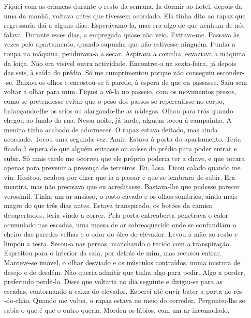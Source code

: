 Fiquei com as crianças durante o resto da semana. Ia dormir ao hotel,
depois da uma da manhã, voltava antes que tivessem acordado. Ela tinha
dito ao rapaz que regressaria daí a alguns dias. Esperávamo­‑la, mas era
algo de que nenhum de nós falava. Durante esses dias, a empregada quase
não veio. Evitava­‑me. Passava às vezes pelo apartamento, quando supunha
que não estivesse ninguém. Punha a roupa na máquina, pendurava­‑a a
secar. Aspirava a cozinha, esvaziava a máquina da loiça. Não era visível
outra actividade. Encontrei­‑a na sexta­‑feira, já depois das seis, à
saída do prédio. Só me cumprimentou porque não conseguiu esconder­‑se.
Baixou os olhos e encostou­‑se à parede, à espera de que eu passasse.
Saiu sem voltar a olhar para mim. Fiquei a vê­‑la no passeio, com os
movimentos presos, como se pretendesse evitar que o peso dos passos se
repercutisse no corpo, balançando­‑lhe os seios ou alargando­‑lhe as
nádegas. Olhou para trás quando chegou ao fundo da rua. Nessa noite, já
tarde, alguém tocou à campainha. A menina tinha acabado de adormecer. O
rapaz estava deitado, mas ainda acordado. Tocou uma segunda vez. Amir.
Estava à porta do apartamento. Teria ficado à espera de que alguém
entrasse ou saísse do prédio para poder entrar e subir. Só mais tarde me
ocorreu que ele próprio poderia ter a chave, e que tocara apenas para
prevenir a presença de terceiros. Eu, Lisa. Ficou calado quando me viu.
Hesitou, acabou por dizer que ia a passar e que se lembrara de subir.
Era mentira, mas não precisava que eu acreditasse. Bastava­‑lhe que
pudesse parecer verosímil. Tinha um ar ansioso, o rosto cavado e os
olhos sombrios, ainda mais magro do que três dias antes. Estava
transpirado, os botões da camisa desapertados, teria vindo a correr.
Pela porta entreaberta penetrava o calor acumulado nas escadas, uma
massa de ar sobreaquecido onde se confundiam o cheiro das paredes velhas
e o odor do óleo do elevador. Levou a mão ao rosto e limpou a testa.
Secou­‑a nas pernas, manchando o tecido com a transpiração. Espreitou
para o interior da sala, por detrás de mim, mas recusou entrar.
Manteve­‑se imóvel, o olhar desviado e os músculos contraídos, numa
mistura de desejo e de desdém. Não queria admitir que tinha algo para
pedir. Algo a perder, preferindo perdê­‑lo. Disse que voltaria no dia
seguinte e dirigiu­‑se para as escadas, contornando a caixa do elevador.
Esperei até ouvir bater a porta no rés­‑do­‑chão. Quando me voltei, o
rapaz estava no meio do corredor. Perguntei­‑lhe se sabia o que é que o
outro queria. Mordeu os lábios, com um ar incomodado.


